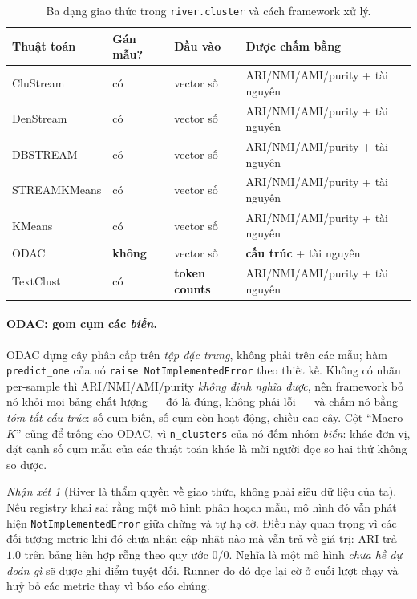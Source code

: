 \documentclass[11pt,a4paper]{article}
\theoremstyle{remark}
\newtheorem{remark}{Nhận xét}
\begin{document}
\begin{table}[htbp]
\centering
\small
\caption{Ba dạng giao thức trong \texttt{river.cluster} và cách framework xử lý.}
\label{tab:protocols}
\begin{tabular}{@{}llll@{}}
\toprule
\textbf{Thuật toán} & \textbf{Gán mẫu?} & \textbf{Đầu vào} & \textbf{Được chấm bằng} \\
\midrule
CluStream    & có & vector số & ARI/NMI/AMI/purity + tài nguyên \\
DenStream    & có & vector số & ARI/NMI/AMI/purity + tài nguyên \\
DBSTREAM     & có & vector số & ARI/NMI/AMI/purity + tài nguyên \\
STREAMKMeans & có & vector số & ARI/NMI/AMI/purity + tài nguyên \\
KMeans       & có & vector số & ARI/NMI/AMI/purity + tài nguyên \\
ODAC         & \textbf{không} & vector số & \textbf{cấu trúc} + tài nguyên \\
TextClust    & có & \textbf{token counts} & ARI/NMI/AMI/purity + tài nguyên \\
\bottomrule
\end{tabular}
\end{table}

\paragraph{ODAC: gom cụm các \emph{biến}.}
ODAC dựng cây phân cấp trên \emph{tập đặc trưng}, không phải trên các mẫu; hàm
\texttt{predict\_one} của nó \texttt{raise NotImplementedError} theo thiết kế.
Không có nhãn per-sample thì ARI/NMI/AMI/purity \emph{không định nghĩa được}, nên
framework bỏ nó khỏi mọi bảng chất lượng --- đó là đúng, không phải lỗi --- và
chấm nó bằng \emph{tóm tắt cấu trúc}: số cụm biến, số cụm còn hoạt động, chiều
cao cây. Cột ``Macro $K$'' cũng để trống cho ODAC, vì \texttt{n\_clusters} của nó
đếm nhóm \emph{biến}: khác đơn vị, đặt cạnh số cụm mẫu của các thuật toán khác là
mời người đọc so hai thứ không so được.

\begin{remark}[River là thẩm quyền về giao thức, không phải siêu dữ liệu của ta]
Nếu registry khai sai rằng một mô hình phân hoạch mẫu, mô hình đó vẫn phát hiện
\texttt{NotImplementedError} giữa chừng và tự hạ cờ. Điều này quan trọng vì các
đối tượng metric khi đó chưa nhận cập nhật nào mà vẫn trả về giá trị: ARI trả
$1.0$ trên bảng liên hợp rỗng theo quy ước $0/0$. Nghĩa là một mô hình
\emph{chưa hề dự đoán gì} sẽ được ghi điểm tuyệt đối. Runner do đó đọc lại cờ ở
cuối lượt chạy và huỷ bỏ các metric thay vì báo cáo chúng.
\end{remark}
\end{document}
